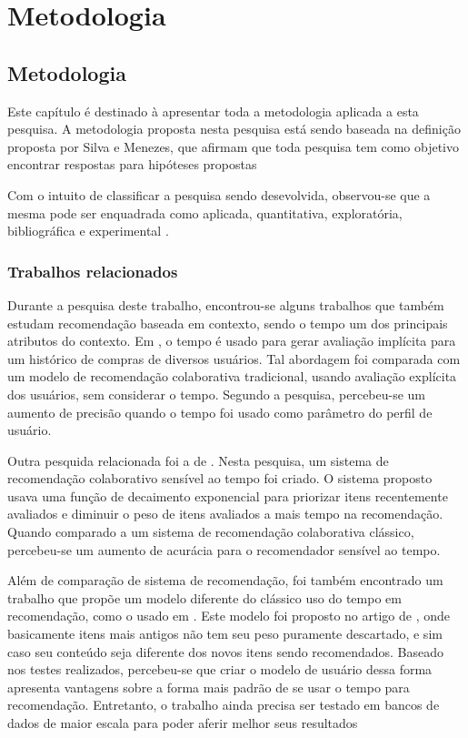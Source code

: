 \part{Metodologia}

\chapter[Metodologia]{Metodologia}

Este capítulo é destinado à apresentar toda a metodologia aplicada a esta
pesquisa. A metodologia proposta nesta pesquisa está sendo
baseada na definição proposta por Silva e Menezes, que afirmam que toda pesquisa
tem como objetivo encontrar respostas para hipóteses propostas
\cite{da2005metodologia}

Com o intuito de classificar a pesquisa sendo desevolvida, observou-se que a
mesma pode ser enquadrada como aplicada, quantitativa, exploratória, bibliográfica e
experimental \cite{da2005metodologia}.


\section{Trabalhos relacionados}

Durante a pesquisa deste trabalho, encontrou-se alguns trabalhos que também estudam recomendação baseada em contexto, sendo o tempo um dos
principais atributos do contexto. Em \cite{lee2008time}, o tempo é usado para gerar avaliação implícita para um histórico de
compras de diversos usuários. Tal abordagem foi comparada com um modelo de recomendação colaborativa tradicional, usando avaliação explícita dos usuários,
sem considerar o tempo. Segundo a pesquisa, percebeu-se um aumento de precisão
quando o tempo foi usado como parâmetro do perfil de usuário.

Outra pesquida relacionada foi a de \cite{ding2005time}. Nesta pesquisa, um
sistema de recomendação colaborativo sensível ao tempo foi criado. O sistema proposto usava uma função de
decaimento exponencial para priorizar itens recentemente avaliados e diminuir o peso de itens avaliados a mais tempo na recomendação. Quando comparado a um sistema de
recomendação colaborativa clássico, percebeu-se um aumento de acurácia para o recomendador sensível ao tempo.

Além de comparação de sistema de recomendação, foi também encontrado um trabalho que propõe um modelo diferente do clássico uso do tempo em recomendação, como o usado em
\cite{ding2005time}. Este modelo foi proposto no artigo de \cite{basile2015modeling}, onde basicamente itens mais antigos não tem seu peso puramente descartado, e sim caso
seu conteúdo seja diferente dos novos itens sendo recomendados. Baseado nos
testes realizados, percebeu-se que criar o modelo de usuário dessa forma apresenta vantagens sobre
a forma mais padrão de se usar o tempo para recomendação. Entretanto, o trabalho ainda precisa ser testado em bancos de dados de maior escala para poder aferir melhor
seus resultados

